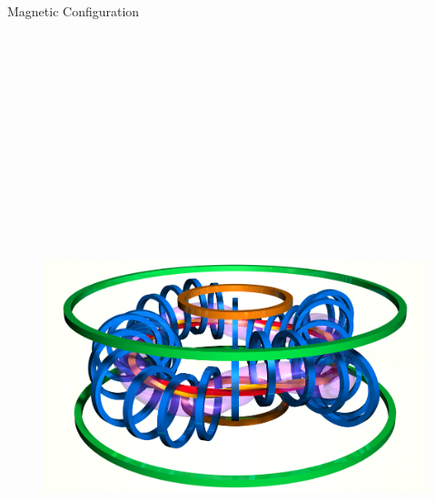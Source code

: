 \documentclass{beamer}
\newlength{\onecolwid}
\begin{document}
\begin{frame}[t]
\begin{columns}[t]
\begin{column}{\onecolwid}
\begin{block}{Magnetic Configuration}
\begin{figure}
	\resizebox{1.0\textwidth}{!}
	{
		\includegraphics[height=20cm]{../Graphics/TJ-II_Coils.png}
		\quad
}
\end{figure}
\end{block}
\end{column}
\end{columns}
\end{frame}
\end{document}
